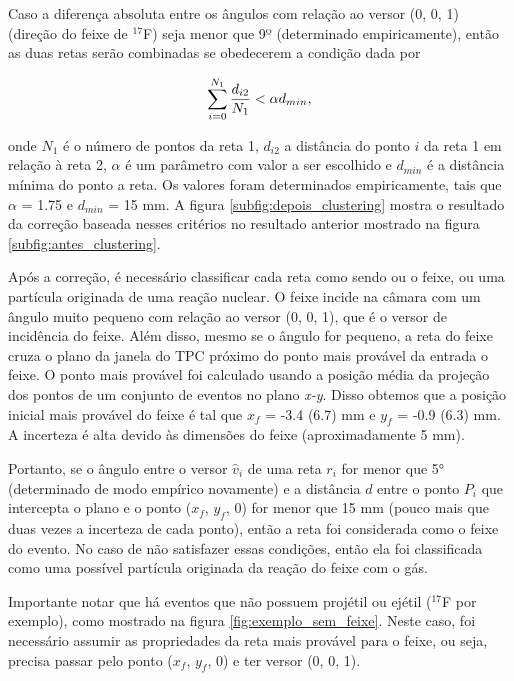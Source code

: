 \documentclass[a4paper,12pt,oneside]{book}
\begin{document}
\par Caso a diferença absoluta entre os ângulos com relação ao versor (0, 0, 1) (direção do feixe de $^{17}$F) seja menor que 9º (determinado empiricamente), então as duas retas serão combinadas se obedecerem a condição dada por

\begin{equation}\label{criterio_clustering}
    \sum_{i = 0}^{N_1}\frac{d_{i2}}{N_1} < \alpha \space d_{min}, 
\end{equation}

onde $N_1$ é o número de pontos da reta 1, $d_{i2}$ a distância do ponto $i$ da reta 1 em relação à reta 2, $\alpha$ é um parâmetro com valor a ser escolhido e $d_{min}$ é a distância mínima do ponto a reta. Os valores foram determinados empiricamente, tais que $\alpha$ = 1.75 e $d_{min}$ = 15 mm. A figura \ref{subfig:depois_clustering} mostra o resultado da correção baseada nesses critérios no resultado anterior mostrado na figura \ref{subfig:antes_clustering}.

\par Após a correção, é necessário classificar cada reta como sendo ou o feixe, ou uma partícula originada de uma reação nuclear. O feixe incide na câmara com um ângulo muito pequeno com relação ao versor (0, 0, 1), que é o versor de incidência do feixe. Além disso, mesmo se o ângulo for pequeno, a reta do feixe cruza o plano da janela do TPC próximo do ponto mais provável da entrada o feixe. O ponto mais provável foi calculado usando a posição média da projeção dos pontos de um conjunto de eventos no plano \textit{x-y}. Disso obtemos que a posição inicial mais provável do feixe é tal que $x_f$ = -3.4 (6.7) mm e $y_f$ = -0.9 (6.3) mm. A incerteza é alta devido às dimensões do feixe (aproximadamente 5 mm).

\par Portanto, se o ângulo entre o versor $\hat{v}_i$ de uma reta $r_i$ for menor que 5° (determinado de modo empírico novamente) e a distância $d$ entre o ponto $P_i$ que intercepta o plano e o ponto ($x_f$, $y_f$, 0) for menor que 15 mm (pouco mais que duas vezes a incerteza de cada ponto), então a reta foi considerada como o feixe do evento. No caso de não satisfazer essas condições, então ela foi classificada como uma possível partícula originada da reação do feixe com o gás.

\par Importante notar que há eventos que não possuem projétil ou ejétil ($^{17}$F por exemplo), como mostrado na figura \ref{fig:exemplo_sem_feixe}. Neste caso, foi necessário assumir as propriedades da reta mais provável para o feixe, ou seja, precisa passar pelo ponto ($x_f$, $y_f$, 0) e ter versor (0, 0, 1).
\end{document}

